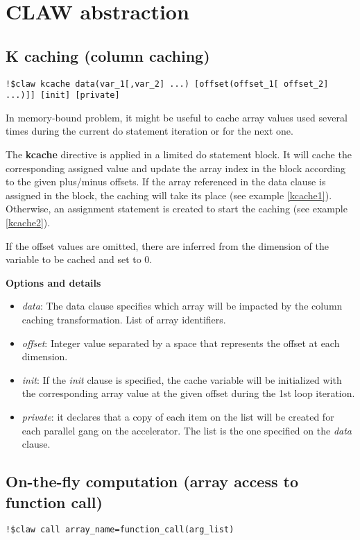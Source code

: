 \section{CLAW abstraction}

\subsection{K caching (column caching)}
\begin{lstlisting}
!$claw kcache data(var_1[,var_2] ...) [offset(offset_1[ offset_2] ...)]] [init] [private]
\end{lstlisting}

In memory-bound problem, it might be useful to cache array values used several times during the current do statement iteration or for the next one.

The \textbf{kcache} directive is applied in a limited do statement block. It will cache the corresponding assigned value and update
the array index in the block according to the given plus/minus offsets. If the array referenced in the data clause is assigned in the block, 
the caching will take its place (see example \ref{kcache1}). Otherwise, an assignment statement is created to start the caching (see example \ref{kcache2}). 

If the offset values are omitted, there are inferred from the dimension of the variable to be cached and set to 0.

\textbf{Options and details}
\begin{itemize}
\item \textit{data}: The data clause specifies which array will be impacted by the column caching transformation. List of array identifiers. 
\item \textit{offset}: Integer value separated by a space that represents the offset at each dimension. 
\item \textit{init}: If the \textit{init} clause is specified, the cache variable will be initialized with the corresponding array value at the given offset during the 1st loop iteration. 
\item \textit{private}: it declares that a copy of each item on the list will be created
for each parallel gang on the accelerator. The list is the one specified on
the \textit{data} clause.
\end{itemize}




\subsection{On-the-fly computation (array access to function call)}
\begin{lstlisting}
!$claw call array_name=function_call(arg_list)
\end{lstlisting}

